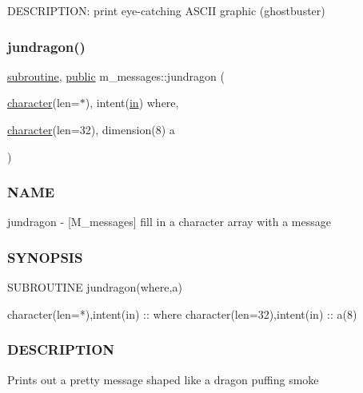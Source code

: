 D\+E\+S\+C\+R\+I\+P\+T\+I\+ON\+: print eye-\/catching A\+S\+C\+II graphic (ghostbuster) \mbox{\label{namespacem__messages_a6bcbaab6d75a4389f2b77860ccc13a7c}} 
\subsubsection{\texorpdfstring{jundragon()}{jundragon()}}
{\footnotesize\ttfamily \hyperlink{M__stopwatch_83_8txt_acfbcff50169d691ff02d4a123ed70482}{subroutine}, \hyperlink{M__stopwatch_83_8txt_a2f74811300c361e53b430611a7d1769f}{public} m\+\_\+messages\+::jundragon (\begin{DoxyParamCaption}\item[{\hyperlink{option__stopwatch_83_8txt_abd4b21fbbd175834027b5224bfe97e66}{character}(len=$\ast$), intent(\hyperlink{M__journal_83_8txt_afce72651d1eed785a2132bee863b2f38}{in})}]{where,  }\item[{\hyperlink{option__stopwatch_83_8txt_abd4b21fbbd175834027b5224bfe97e66}{character}(len=32), dimension(8)}]{a }\end{DoxyParamCaption})}



\subsubsection*{N\+A\+ME}

jundragon -\/ \mbox{[}M\+\_\+messages\mbox{]} fill in a character array with a message 

\subsubsection*{S\+Y\+N\+O\+P\+S\+IS}

\begin{DoxyVerb}  SUBROUTINE jundragon(where,a)

   character(len=*),intent(in) :: where
   character(len=32),intent(in) :: a(8)
\end{DoxyVerb}


\subsubsection*{D\+E\+S\+C\+R\+I\+P\+T\+I\+ON}

Prints out a pretty message shaped like a dragon puffing smoke

